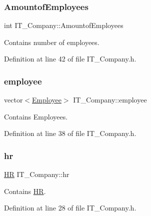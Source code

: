 \subsubsection{\texorpdfstring{Amountof\+Employees}{AmountofEmployees}}
{\footnotesize\ttfamily int I\+T\+\_\+\+Company\+::\+Amountof\+Employees\hspace{0.3cm}{\ttfamily [private]}}



Contains number of employees. 



Definition at line 42 of file I\+T\+\_\+\+Company.\+h.

\mbox{\label{class_i_t___company_a26c2bb58e3f36ccc1fcfeebe651a29d2}} 
\subsubsection{\texorpdfstring{employee}{employee}}
{\footnotesize\ttfamily vector$<$\hyperlink{class_employee}{Employee}$>$ I\+T\+\_\+\+Company\+::employee\hspace{0.3cm}{\ttfamily [private]}}



Contains Employees. 



Definition at line 38 of file I\+T\+\_\+\+Company.\+h.

\mbox{\label{class_i_t___company_a9ef1fdbdfe9220c9f91fee83bfe65c29}} 
\subsubsection{\texorpdfstring{hr}{hr}}
{\footnotesize\ttfamily \hyperlink{class_h_r}{HR} I\+T\+\_\+\+Company\+::hr}



Contains \hyperlink{class_h_r}{HR}. 



Definition at line 28 of file I\+T\+\_\+\+Company.\+h.

\mbox{\label{class_i_t___company_a2c19371df703f0aa969aaf8bfba32874}} 

